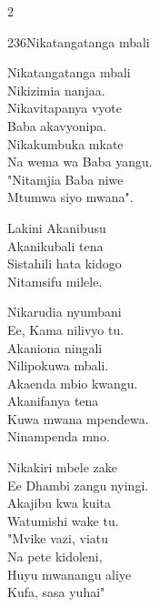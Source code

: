 \begin{multicols}{2}
\begin{hymn}{236}{Nikatangatanga mbali}{}
\begin{stanza}
Nikatangatanga mbali\\
Nikizimia nanjaa.\\
Nikavitapanya vyote\\
Baba akavyonipa.\\
Nikakumbuka mkate\\
Na wema wa Baba yangu.\\
"Nitamjia Baba niwe\\
Mtumwa siyo mwana".
\end{stanza}
\begin{chorus}
Lakini Akanibusu\\
Akanikubali tena\\
Sistahili hata kidogo\\
Nitamsifu milele.
\end{chorus}
\begin{stanza}
Nikarudia nyumbani\\
Ee, Kama nilivyo tu.\\
Akaniona ningali\\
Nilipokuwa mbali.\\
Akaenda mbio kwangu.\\
Akanifanya tena\\
Kuwa mwana mpendewa.\\
Ninampenda mno.
\end{stanza}
\begin{stanza}
Nikakiri mbele zake\\
Ee Dhambi zangu nyingi.\\
Akajibu kwa kuita\\
Watumishi wake tu.\\
"Mvike vazi, viatu\\
Na pete kidoleni,\\
Huyu mwanangu aliye\\
Kufa, sasa yuhai"
\end{stanza}
\end{hymn}


\end{multicols}

